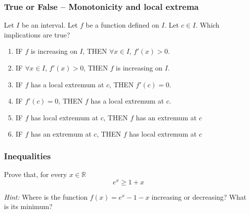 \documentclass[14pt]{beamer}
\newcommand{\azul}[1]{{\color{blue} #1}}
\newcommand{\rojo}[1]{{\color{red} #1}}
\newcommand{\verde}[1]{{\color{verde} #1}}
\newcommand{\rosa}[1]{{\color{rosa} #1}}
\newcommand{\naranja}[1]{{\color{naranja} #1}}
\newcommand{\setsize}[1]{\fontsize{#1}{#1}\selectfont} %
\newcommand{\smallerfont}{\setsize{13}} %
\begin{document}
	\begin{frame}[t]
		\smallerfont
		\frametitle{True or False -- Monotonicity and local extrema}

		Let $I$ be an interval. Let $f$ be a function defined on $I$. Let $c \in I$.
		Which implications are true?

		\medskip
		\begin{enumerate}
			\item IF \rojo{$f$ is increasing on $I$}, \quad THEN \azul{$\forall x \in I$, $f'(x) >0$}.

			\item IF \azul{$\forall x \in I$, $f'(x) >0$}, \quad THEN \rojo{$f$ is increasing on $I$}.

				\medskip


			\item IF \rosa{$f$ has a local extremum at $c$}, \quad THEN \naranja{$f'(c)=0$}.

			\item IF \naranja{$f'(c)=0$}, \quad THEN \rosa{$f$ has a local extremum at $c$}.

				\medskip


			\item IF \rosa{$f$ has local extremum at $c$}, \; THEN \verde{$f$ has an extremum at $c$}

			\item IF \verde{$f$ has an extremum at $c$}, \; THEN \rosa{$f$ has local extremum at $c$}
		\end{enumerate}
	\end{frame}

	\begin{frame}[t]
		\frametitle{Inequalities}

		Prove that, for every $x \in \mathbb{R}$
		\[
			e^{x}\geq 1 + x
		\]

		\medskip
		\emph{Hint:} Where is the function $\displaystyle f(x) =e^x - 1-x$ increasing
		or decreasing? What is its minimum?
	\end{frame}
\end{document}

